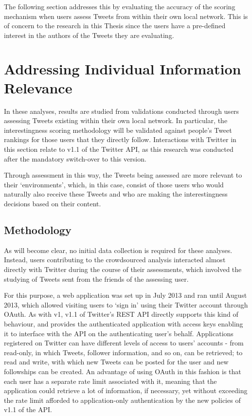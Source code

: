 The following section addresses this by evaluating the accuracy of the scoring mechanism when users assess Tweets from within their own local network. This is of concern to the research in this Thesis since the users have a pre-defined interest in the authors of the Tweets they are evaluating. 


\section{Addressing Individual Information Relevance}
In these analyses, results are studied from validations conducted through users assessing Tweets existing within their own local network. In particular, the interestingness scoring methodology will be validated against people's Tweet rankings for those users that they directly follow. Interactions with Twitter in this section relate to v1.1 of the Twitter API, as this research was conducted after the mandatory switch-over to this version.

Through assessment in this way, the Tweets being assessed are more relevant to their `environments', which, in this case, consist of those users who would naturally also receive these Tweets and who are making the interestingness decisions based on their content.


\subsection{Methodology}
As will become clear, no initial data collection is required for these analyses. Instead, users contributing to the crowdsourced analysis interacted almost directly with Twitter during the course of their assessments, which involved the studying of Tweets sent from the friends of the assessing user.

For this purpose, a web application was set up in July 2013 and ran until August 2013, which allowed visiting users to `sign in' using their Twitter account through OAuth. As with v1, v1.1 of Twitter's REST API directly supports this kind of behaviour, and provides the authenticated application with access keys enabling it to interface with the API on the authenticating user's behalf. Applications registered on Twitter can have different levels of access to users' accounts - from read-only, in which Tweets, follower information, and so on, can be retrieved; to read and write, with which new Tweets can be posted for the user and new followships can be created. An advantage of using OAuth in this fashion is that each user has a separate rate limit associated with it, meaning that the application could retrieve a lot of information, if necessary, yet without exceeding the rate limit afforded to application-only authentication by the new policies of v1.1 of the API.

